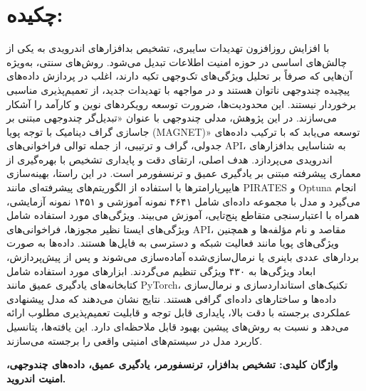 \documentclass[a4paper,oneside,12pt]{report}
\theoremstyle{definition}
\begin{document}
\chapter*{\vspace{-2.38cm}\fontsize{17}{18}\selectfont \bfseries چکیده:}
\vspace{-1.5cm}\setlength{\parindent}{0pt}
با افزایش روزافزون تهدیدات سایبری، تشخیص بدافزارهای اندرویدی به یکی از چالش‌های اساسی در حوزه امنیت اطلاعات تبدیل می‌شود. روش‌های سنتی، به‌ویژه آن‌هایی که صرفاً بر تحلیل ویژگی‌های تک‌وجهی تکیه دارند، اغلب در پردازش داده‌های پیچیده چندوجهی ناتوان هستند و در مواجهه با تهدیدات جدید، از تعمیم‌پذیری مناسبی برخوردار نیستند. این محدودیت‌ها، ضرورت توسعه رویکردهای نوین و کارآمد را آشکار می‌سازند. در این پژوهش، مدلی چندوجهی با عنوان «تبدیل‌گر چندوجهی مبتنی بر جاسازی گراف دینامیک با توجه پویا (MAGNET)» توسعه می‌یابد که با ترکیب داده‌های جدولی، گراف و ترتیبی، از جمله توالی فراخوانی‌های API، به شناسایی بدافزارهای اندرویدی می‌پردازد. هدف اصلی، ارتقای دقت و پایداری تشخیص با بهره‌گیری از معماری پیشرفته مبتنی بر یادگیری عمیق و ترنسفورمر است. در این راستا، بهینه‌سازی هایپرپارامترها با استفاده از الگوریتم‌های پیشرفته‌ای مانند PIRATES و Optuna انجام می‌گیرد و مدل با مجموعه داده‌ای شامل ۴۶۴۱ نمونه آموزشی و ۱۴۵۱ نمونه آزمایشی، همراه با اعتبارسنجی متقاطع پنج‌تایی، آموزش می‌بیند. ویژگی‌های مورد استفاده شامل ویژگی‌های ایستا نظیر مجوزها، فراخوانی‌های API، مقاصد و نام مؤلفه‌ها و همچنین ویژگی‌های پویا مانند فعالیت شبکه و دسترسی به فایل‌ها هستند. داده‌ها به صورت بردارهای عددی باینری یا نرمال‌سازی‌شده آماده‌سازی می‌شوند و پس از پیش‌پردازش، ابعاد ویژگی‌ها به ۴۳۰ ویژگی تنظیم می‌گردند. ابزارهای مورد استفاده شامل کتابخانه‌های یادگیری عمیق مانند PyTorch، تکنیک‌های استانداردسازی و نرمال‌سازی داده‌ها و ساختارهای داده‌ای گرافی هستند. نتایج نشان می‌دهند که مدل پیشنهادی عملکردی برجسته با دقت بالا، پایداری قابل توجه و قابلیت تعمیم‌پذیری مطلوب ارائه می‌دهد و نسبت به روش‌های پیشین بهبود قابل ملاحظه‌ای دارد. این یافته‌ها، پتانسیل کاربرد مدل در سیستم‌های امنیتی واقعی را برجسته می‌سازند.

\par\vspace{.5cm}\setlength{\parindent}{0pt}
{\fontsize{13}{14}\selectfont\bfseries واژگان کلیدی: تشخیص بدافزار، ترنسفورمر، یادگیری عمیق، داده‌های چندوجهی، امنیت اندروید.}

\newpage


\tableofcontents
\cleardoublepage

\setlength{\cftfignumwidth}{2.5em}
{
	\let\oldnumberline\numberline%
	\renewcommand{\numberline}{\tablename~\oldnumberline}%
\listoftables%
}
\cleardoublepage
\end{document}
